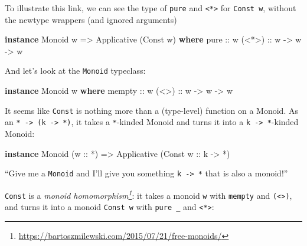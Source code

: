 \documentclass[]{article}
\newenvironment{Shaded}{}{}
\newcommand{\DataTypeTok}[1]{\textcolor[rgb]{0.56,0.13,0.00}{#1}}
\newcommand{\KeywordTok}[1]{\textcolor[rgb]{0.00,0.44,0.13}{\textbf{#1}}}
\newcommand{\NormalTok}[1]{#1}
\newcommand{\OperatorTok}[1]{\textcolor[rgb]{0.40,0.40,0.40}{#1}}
\newcommand{\OtherTok}[1]{\textcolor[rgb]{0.00,0.44,0.13}{#1}}
\renewcommand{\href}[2]{#2\footnote{\url{#1}}}
\begin{document}
To illustrate this link, we can see the type of \texttt{pure} and
\texttt{\textless{}*\textgreater{}} for \texttt{Const\ w}, without the newtype
wrappers (and ignored arguments)

\begin{Shaded}
\begin{Highlighting}[]
\KeywordTok{instance} \DataTypeTok{Monoid}\NormalTok{ w }\OtherTok{=\textgreater{}} \DataTypeTok{Applicative}\NormalTok{ (}\DataTypeTok{Const}\NormalTok{ w) }\KeywordTok{where}
\OtherTok{    pure  ::}\NormalTok{ w}
\OtherTok{    (\textless{}*\textgreater{}) ::}\NormalTok{ w }\OtherTok{{-}\textgreater{}}\NormalTok{ w }\OtherTok{{-}\textgreater{}}\NormalTok{ w}
\end{Highlighting}
\end{Shaded}

And let's look at the \texttt{Monoid} typeclass:

\begin{Shaded}
\begin{Highlighting}[]
\KeywordTok{instance} \DataTypeTok{Monoid}\NormalTok{ w }\KeywordTok{where}
\OtherTok{    mempty ::}\NormalTok{ w}
\OtherTok{    (\textless{}\textgreater{})   ::}\NormalTok{ w }\OtherTok{{-}\textgreater{}}\NormalTok{ w }\OtherTok{{-}\textgreater{}}\NormalTok{ w}
\end{Highlighting}
\end{Shaded}

It seems like \texttt{Const} is nothing more than a (type-level) function on a
Monoid. As an \texttt{*\ -\textgreater{}\ (k\ -\textgreater{}\ *)}, it takes a
\texttt{*}-kinded Monoid and turns it into a
\texttt{k\ -\textgreater{}\ *}-kinded Monoid:

\begin{Shaded}
\begin{Highlighting}[]
\KeywordTok{instance} \DataTypeTok{Monoid}\NormalTok{ (}\OtherTok{w ::} \OperatorTok{*}\NormalTok{) }\OtherTok{=\textgreater{}} \DataTypeTok{Applicative}\NormalTok{ (}\DataTypeTok{Const}\OtherTok{ w ::}\NormalTok{ k }\OtherTok{{-}\textgreater{}} \OperatorTok{*}\NormalTok{)}
\end{Highlighting}
\end{Shaded}

``Give me a \texttt{Monoid} and I'll give you something
\texttt{k\ -\textgreater{}\ *} that is also a monoid!''

\texttt{Const} is a
\emph{\href{https://bartoszmilewski.com/2015/07/21/free-monoids/}{monoid
homomorphism}}: it takes a monoid \texttt{w} with \texttt{mempty} and
\texttt{(\textless{}\textgreater{})}, and turns it into a monoid
\texttt{Const\ w} with \texttt{pure\ \_} and
\texttt{\textless{}*\textgreater{}}:
\end{document}
